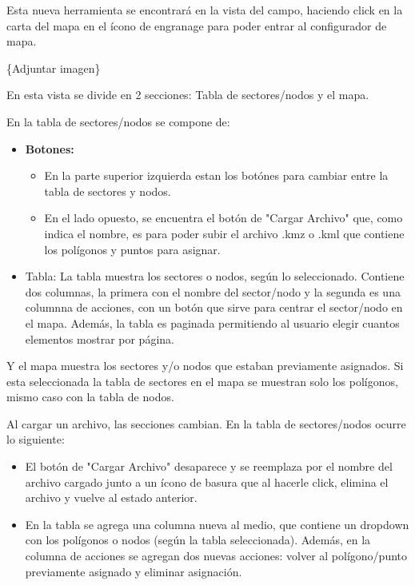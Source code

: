 Esta nueva herramienta se encontrará en la vista del campo, haciendo click en la carta del mapa en el ícono de engranage para poder entrar al configurador de mapa.

\{Adjuntar imagen\}

En esta vista se divide en 2 secciones: Tabla de sectores/nodos y el mapa.

En la tabla de sectores/nodos se compone de:

\begin{itemize}
    \item \textbf{Botones:}
          \begin{itemize}
              \item En la parte superior izquierda estan los botónes para cambiar entre la tabla de sectores y nodos.
              \item En el lado opuesto, se encuentra el botón de "Cargar Archivo" que, como indica el nombre, es para poder subir el archivo .kmz o .kml que contiene los polígonos y puntos para asignar.
          \end{itemize}
    \item Tabla: La tabla muestra los sectores o nodos, según lo seleccionado. Contiene dos columnas, la primera con el nombre del sector/nodo y la segunda es una columnna de acciones, con un botón que sirve para centrar el sector/nodo en el mapa. Además, la tabla es paginada permitiendo al usuario elegir cuantos elementos mostrar por página.
\end{itemize}

Y el mapa muestra los sectores y/o nodos que estaban previamente asignados. Si esta seleccionada la tabla de sectores en el mapa se muestran solo los polígonos, mismo caso con la tabla de nodos.

Al cargar un archivo, las secciones cambian. En la tabla de sectores/nodos ocurre lo siguiente:

\begin{itemize}
    \item El botón de "Cargar Archivo" desaparece y se reemplaza por el nombre del archivo cargado junto a un ícono de basura que al hacerle click, elimina el archivo y vuelve al estado anterior.
    \item En la tabla se agrega una columna nueva al medio, que contiene un dropdown con los polígonos o nodos (según la tabla seleccionada). Además, en la columna de acciones se agregan dos nuevas acciones: volver al polígono/punto previamente asignado y eliminar asignación.
\end{itemize}



